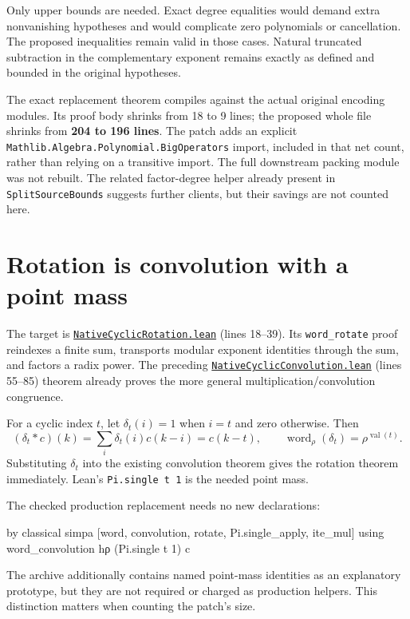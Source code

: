 \documentclass[11pt,letterpaper]{article}
\newcommand{\code}[1]{\nolinkurl{#1}}
\newcommand{\src}[2]{\href{https://github.com/VladimirReshetnikov/ProveIt/blob/e73fa2e916c9bb6f61c79e4fe2cd02b5f43e9d11/Computability/DiophantineConsistency/Lean/DiophantineConsistency/#1.lean}{\nolinkurl{#1.lean}} (lines #2)}
\begin{document}
Only upper bounds are needed. Exact degree equalities would demand extra nonvanishing hypotheses and would complicate zero polynomials or cancellation. The proposed inequalities remain valid in those cases. Natural truncated subtraction in the complementary exponent remains exactly as defined and bounded in the original hypotheses.

The exact replacement theorem compiles against the actual original encoding modules. Its proof body shrinks from 18 to 9 lines; the proposed whole file shrinks from \textbf{204 to 196 lines}. The patch adds an explicit \code{Mathlib.Algebra.Polynomial.BigOperators} import, included in that net count, rather than relying on a transitive import. The full downstream packing module was not rebuilt. The related factor-degree helper already present in \code{SplitSourceBounds} suggests further clients, but their savings are not counted here.

\section{Rotation is convolution with a point mass}

The target is \src{NativeCyclicRotation}{18--39}. Its \code{word_rotate} proof reindexes a finite sum, transports modular exponent identities through the sum, and factors a radix power. The preceding \src{NativeCyclicConvolution}{55--85} theorem already proves the more general multiplication/convolution congruence.

For a cyclic index \(t\), let \(\delta_t(i)=1\) when \(i=t\) and zero otherwise. Then
\[
 (\delta_t*c)(k)=\sum_i\delta_t(i)c(k-i)=c(k-t),
 \qquad \operatorname{word}_{\rho}(\delta_t)=\rho^{\operatorname{val}(t)}.
\]
Substituting \(\delta_t\) into the existing convolution theorem gives the rotation theorem immediately. Lean's \code{Pi.single t 1} is the needed point mass.

The checked production replacement needs no new declarations:

\begin{Lean}
by
  classical
  simpa [word, convolution, rotate, Pi.single_apply, ite_mul] using
    word_convolution hρ (Pi.single t 1) c
\end{Lean}

The archive additionally contains named point-mass identities as an explanatory prototype, but they are not required or charged as production helpers. This distinction matters when counting the patch's size.
\end{document}
